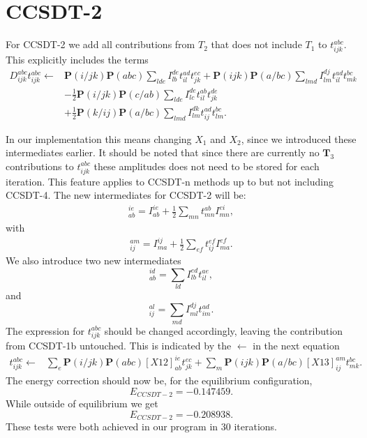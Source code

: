 \section{CCSDT-2}
For CCSDT-2 we add all contributions from $T_2$ that does not include $T_1$ to $t_{ijk}^{abc}$. This explicitly includes the terms
\begin{align}
D_{ijk}^{abc} t_{ijk}^{abc} \leftarrow & 
\textbf{P}(i/jk) \textbf{P}(abc) \sum_{lde} I_{lb}^{de} t_{il}^{ad} t_{jk}^{ec}
+ \textbf{P}(ijk) \textbf{P}(a/bc) \sum_{lmd} I_{lm}^{dj} t_{il}^{ad} t_{mk}^{bc} \nonumber \\ &
- \frac{1}{2} \textbf{P}(i/jk) \textbf{P}(c/ab) \sum_{lde} I_{lc}^{de} t_{il}^{ab} t_{jk}^{de} \nonumber \\ & 
 + \frac{1}{2} \textbf{P}(k/ij) \textbf{P}(a/bc) \sum_{lmd} I_{lm}^{dk} t_{ij}^{ad} t_{lm}^{bc}  .
\end{align}

In our implementation this means changing $X_1$ and $X_2$, since we
introduced these intermediates earlier. It should be noted that since
there are currently no $\textbf{T}_3$ contributions to $t_{ijk}^{abc}$
these amplitudes does not need to be stored for each iteration. This
feature applies to CCSDT-n methods up to but not including CCSDT-4. The
new intermediates for CCSDT-2 will be:
\begin{align}
[X1]_{ab}^{ie} = I_{ab}^{ie} +
\frac{1}{2} \sum_{mn} t_{mn}^{ab} I_{mn}^{ei},
\end{align}
with
\begin{align}
[X2]_{ij}^{am} = I_{ma}^{ij} + \frac{1}{2} \sum_{ef} t_{ij}^{ef} I_{ma}^{ef}  .
\end{align}
We also introduce two new intermediates
\begin{equation}
[X12]_{ab}^{id} = \sum_{ld} I_{lb}^{ed} t_{il}^{ae},
\end{equation}
and
\begin{equation}
[X13]_{ij}^{al} = \sum_{md} I_{ml}^{dj} t^{ad}_{im} .
\end{equation}
The expression for $t_{ijk}^{abc}$ should be changed accordingly,
leaving the contribution from CCSDT-1b untouched. This is indicated by
the $\leftarrow$ in the next equation
\begin{align}
t_{ijk}^{abc} \leftarrow &
\sum_e \textbf{P}(i/jk) \textbf{P}(abc) [X12]_{ab}^{ie} t_{jk}^{ec}
+ \sum_m \textbf{P} (ijk) \textbf{P}(a/bc) [X13]_{ij}^{am} t_{mk}^{bc} .
\end{align}
The energy correction should now be, for the equilibrium configuration,
\begin{equation}
E_{CCSDT-2} = -0.147459 .
\end{equation}
While outside of equilibrium we get
\begin{equation}
E_{CCSDT-2} = -0.208938 .
\end{equation}
These tests were both achieved in our program in 30 iterations.

